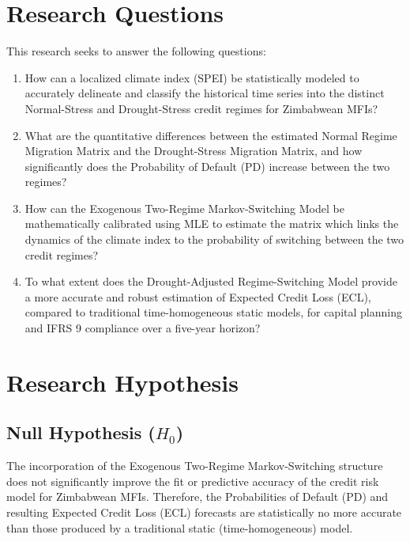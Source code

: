 \documentclass[12pt,a4paper]{article}
\begin{document}
\section{Research Questions}

This research seeks to answer the following questions:

\begin{enumerate}[noitemsep]
    \item How can a localized climate index (SPEI) be statistically modeled to accurately delineate and classify the historical time series into the distinct Normal-Stress and Drought-Stress credit regimes for Zimbabwean MFIs?
    
    \item What are the quantitative differences between the estimated Normal Regime Migration Matrix and the Drought-Stress Migration Matrix, and how significantly does the Probability of Default (PD) increase between the two regimes?
    
    \item How can the Exogenous Two-Regime Markov-Switching Model be mathematically calibrated using MLE to estimate the matrix which links the dynamics of the climate index to the probability of switching between the two credit regimes?
    
    \item To what extent does the Drought-Adjusted Regime-Switching Model provide a more accurate and robust estimation of Expected Credit Loss (ECL), compared to traditional time-homogeneous static models, for capital planning and IFRS 9 compliance over a five-year horizon?
\end{enumerate}

\section{Research Hypothesis}

\subsection{Null Hypothesis ($H_0$)}

The incorporation of the Exogenous Two-Regime Markov-Switching structure does not significantly improve the fit or predictive accuracy of the credit risk model for Zimbabwean MFIs. Therefore, the Probabilities of Default (PD) and resulting Expected Credit Loss (ECL) forecasts are statistically no more accurate than those produced by a traditional static (time-homogeneous) model.
\end{document}
